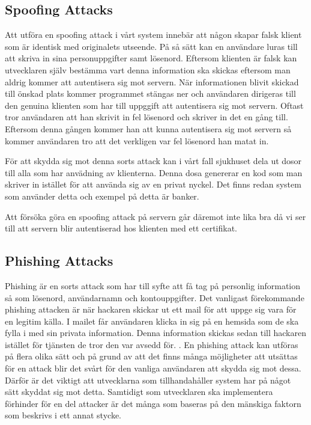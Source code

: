 \subsection{Spoofing Attacks}

Att utföra en spoofing attack i vårt system innebär att någon skapar falsk klient som är identisk med originalets utseende. På så sätt kan en användare luras till att skriva in sina personuppgifter samt lösenord. Eftersom klienten är falsk kan utvecklaren själv bestämma vart denna information ska skickas eftersom man aldrig kommer att autentisera sig mot servern. När informationen blivit skickad till önskad plats kommer programmet stängas ner och användaren dirigeras till den genuina klienten som har till uppggift att autentisera sig mot servern. Oftast tror användaren att han skrivit in fel lösenord och skriver in det en gång till. Eftersom denna gången kommer han att kunna autentisera sig mot servern så kommer användaren tro att det verkligen var fel lösenord han matat in. 

För att skydda sig mot denna sorts attack kan i vårt fall sjukhuset dela ut dosor till alla som har anvädning av klienterna. Denna dosa genererar en kod som man skriver in istället för att använda sig av en privat nyckel. Det finns redan system som använder detta och exempel på detta är banker. 

Att försöka göra en spoofing attack på servern går däremot inte lika bra då vi ser till att servern blir autentiserad hos klienten med ett certifikat.

\subsection{Phishing Attacks}

Phishing är en sorts attack som har till syfte att få tag på personlig information så som lösenord, användarnamn och kontouppgifter. Det vanligast förekommande phishing attacken är när hackaren skickar ut ett mail för att uppge sig vara för en legitim källa. I mailet får användaren klicka in sig på en hemsida som de ska fylla i med sin privata information. Denna information skickas sedan till hackaren istället för tjänsten de tror den var avsedd för. \cite{Phishing}. En phishing attack kan utföras på flera olika sätt och på grund av att det finns många möjligheter att utsättas för en attack blir det svårt för den vanliga användaren att skydda sig mot dessa. Därför är det viktigt att utvecklarna som tillhandahåller system har på något sätt skyddat sig mot detta. Samtidigt som utvecklaren ska implementera förhinder för en del attacker är det många som baseras på den mänskiga faktorn som beskrivs i ett annat stycke. 

